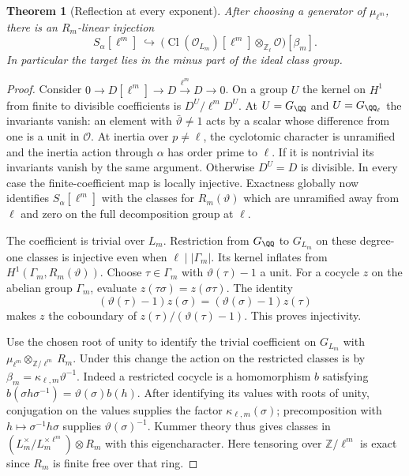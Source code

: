 \documentclass[a4paper,11pt]{article}
\newtheorem{theorem}[proposition]{Theorem}
\theoremstyle{definition}
\theoremstyle{remark}
\newcommand{\ZZ}{\mathbb Z}\newcommand{\ord}{\operatorname{ord}}
\numberwithin{equation}{section}
\newcommand{\Cl}{\operatorname{Cl}}
\newcommand{\OO}{\mathcal O}
\begin{document}
\begin{theorem}[Reflection at every exponent]\label{thm:mirror}
After choosing a generator of \(\mu_{\ell^m}\), there is an \(R_m\)-linear injection
\begin{equation}
 S_\alpha[\ell^m]\ \hookrightarrow\
      \big(\Cl(\OO_{L_m})[\ell^m]\otimes_{\ZZ_\ell}\OO\big)[\beta_m].
 \label{eq:mirror}
\end{equation}
In particular the target lies in the minus part of the ideal class group.
\end{theorem}
\begin{proof}
Consider \(0\to D[\ell^m]\to D\xrightarrow{\ell^m}D\to0\). On a group \(U\) the kernel on \(H^1\) from finite to divisible coefficients is \(D^U/\ell^mD^U\). At \(U=G_\QQ\) and \(U=G_{\QQ_\ell}\) the invariants vanish: an element with \(\bar\vartheta\ne1\) acts by a scalar whose difference from one is a unit in \(\OO\). At inertia over \(p\ne\ell\), the cyclotomic character is unramified and the inertia action through \(\alpha\) has order prime to \(\ell\). If it is nontrivial its invariants vanish by the same argument. Otherwise \(D^U=D\) is divisible. In every case the finite-coefficient map is locally injective. Exactness globally now identifies \(S_\alpha[\ell^m]\) with the classes for \(R_m(\vartheta)\) which are unramified away from \(\ell\) and zero on the full decomposition group at \(\ell\).

The coefficient is trivial over \(L_m\). Restriction from \(G_\QQ\) to \(G_{L_m}\) on these degree-one classes is injective even when \(\ell\mid|\Gamma_m|\). Its kernel inflates from \(H^1(\Gamma_m,R_m(\vartheta))\). Choose \(\tau\in\Gamma_m\) with \(\vartheta(\tau)-1\) a unit. For a cocycle \(z\) on the abelian group \(\Gamma_m\), evaluate \(z(\tau\sigma)=z(\sigma\tau)\). The identity
\[
   (\vartheta(\tau)-1)z(\sigma)=(\vartheta(\sigma)-1)z(\tau)
\]
makes \(z\) the coboundary of \(z(\tau)/(\vartheta(\tau)-1)\). This proves injectivity.

Use the chosen root of unity to identify the trivial coefficient on \(G_{L_m}\) with \(\mu_{\ell^m}\otimes_{\ZZ/\ell^m} R_m\). Under this change the action on the restricted classes is by \(\beta_m=\kappa_{\ell,m}\vartheta^{-1}\). Indeed a restricted cocycle is a homomorphism \(b\) satisfying \(b(\sigma h\sigma^{-1})=\vartheta(\sigma)b(h)\). After identifying its values with roots of unity, conjugation on the values supplies the factor \(\kappa_{\ell,m}(\sigma)\); precomposition with \(h\mapsto\sigma^{-1}h\sigma\) supplies \(\vartheta(\sigma)^{-1}\). Kummer theory thus gives classes in \((L_m^\times/L_m^{\times\ell^m})\otimes R_m\) with this eigencharacter. Here tensoring over \(\ZZ/\ell^m\) is exact since \(R_m\) is finite free over that ring.


\end{proof}
\end{document}
